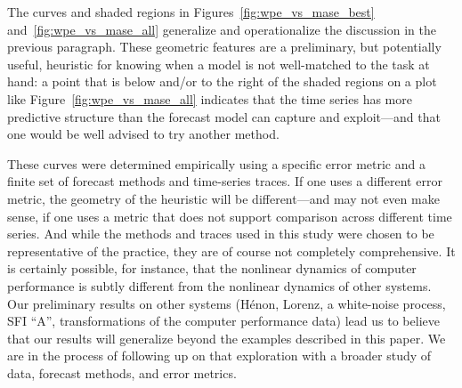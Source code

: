 The curves and shaded regions in Figures~\ref{fig:wpe_vs_mase_best}
and~\ref{fig:wpe_vs_mase_all} generalize and operationalize the
discussion in the previous paragraph.  These geometric features are a
preliminary, but potentially useful, heuristic for knowing when a
model is not well-matched to the task at hand: a point that is below
and/or to the right of the shaded regions on a plot like
Figure~\ref{fig:wpe_vs_mase_all} indicates that the time series has
more predictive structure than the forecast model can capture and
exploit---and that one would be well advised to try another method.

These curves were determined empirically using a specific error metric
and a finite set of forecast methods and time-series traces.  If one
uses a different error metric, the geometry of the heuristic will be
different---and may not even make sense, if one uses a metric that
does not support comparison across different time series.  And while
the methods and traces used in this study were chosen to be
representative of the practice, they are of course not completely
comprehensive.  It is certainly possible, for instance, that the
nonlinear dynamics of computer performance is subtly different from
the nonlinear dynamics of other systems.  Our preliminary results on
other systems (H\'enon, Lorenz, a white-noise process, SFI ``A'',
transformations of the computer performance data) lead us to believe
that our results will generalize beyond the examples described in this
paper.  We are in the process of following up on that exploration with
a broader study of data, forecast methods, and error metrics.

% 

